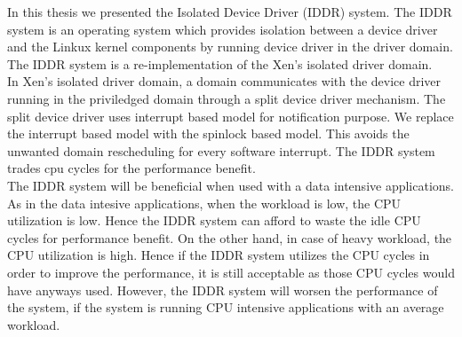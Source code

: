 In this thesis we presented the Isolated Device Driver (IDDR) system. The IDDR system is an operating system which provides isolation between a device driver and the Linkux kernel components by running device driver in the driver domain. The IDDR system is a re-implementation of the Xen's isolated driver domain. 
\\[3mm]
In Xen's isolated driver domain, a domain communicates with the device driver running in the priviledged domain through a split device driver mechanism. The split device driver uses interrupt based model for notification purpose. We replace the interrupt based model with the spinlock based model. This avoids the unwanted domain rescheduling for every software interrupt. The IDDR system trades cpu cycles for the performance benefit.
\\[3mm]
The IDDR system will be beneficial when used with a data intensive applications. As in the data intesive applications, when the workload is low, the CPU utilization is low. Hence the IDDR system can afford to waste the idle CPU cycles for performance benefit. On the other hand, in case of heavy workload, the CPU utilization is high. Hence if the IDDR system utilizes the CPU cycles in order to improve the performance, it is still acceptable as those CPU cycles would have anyways used. However, the IDDR system will worsen the performance of the system, if the system is running CPU intensive applications with an average workload.
